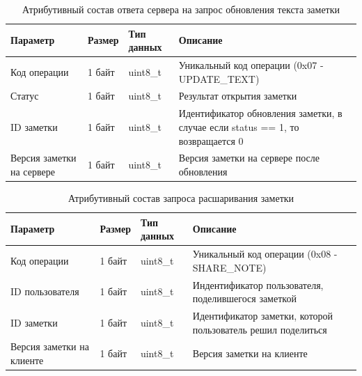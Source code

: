 \begin{table}[H]
    \centering
    \caption{Атрибутивный состав ответа сервера на запрос обновления текста заметки}
    \renewcommand{\arraystretch}{1.2}
    \begin{tabular}{|p{4cm}|p{2cm}|p{3cm}|p{6cm}|}
    \hline
    \textbf{Параметр} & \textbf{Размер} & \textbf{Тип данных} & \textbf{Описание} \\ \hline
    Код операции & 1 байт & uint8\_t & Уникальный код операции (0x07 - UPDATE\_TEXT) \\ \hline
    Статус & 1 байт & uint8\_t & Результат открытия заметки \\ \hline
    ID заметки & 1 байт & uint8\_t & Идентификатор обновления заметки, в случае если status == 1, то возвращается 0 \\ \hline
    Версия заметки на сервере & 1 байт & uint8\_t & Версия заметки на сервере после обновления \\ \hline
    \end{tabular}
    \label{tab:note_create_response_min}
\end{table}


\begin{table}[H]
    \centering
    \caption{Атрибутивный состав запроса расшаривания заметки}
    \begin{tabular}{|p{4cm}|p{2cm}|p{3cm}|p{6cm}|}
    \hline
    \textbf{Параметр} & \textbf{Размер} & \textbf{Тип данных} & \textbf{Описание} \\ \hline
    Код операции & 1 байт & uint8\_t & Уникальный код операции (0x08 - SHARE\_NOTE) \\ \hline
    ID пользователя & 1 байт & uint8\_t & Индентификатор пользователя, поделившегося заметкой \\ \hline
    ID заметки & 1 байт & uint8\_t & Идентификатор заметки, которой пользователь решил поделиться \\ \hline
    Версия заметки на клиенте & 1 байт & uint8\_t & Версия заметки на клиенте \\ \hline
    \end{tabular}
    \label{tab:note_create_request}
\end{table}



